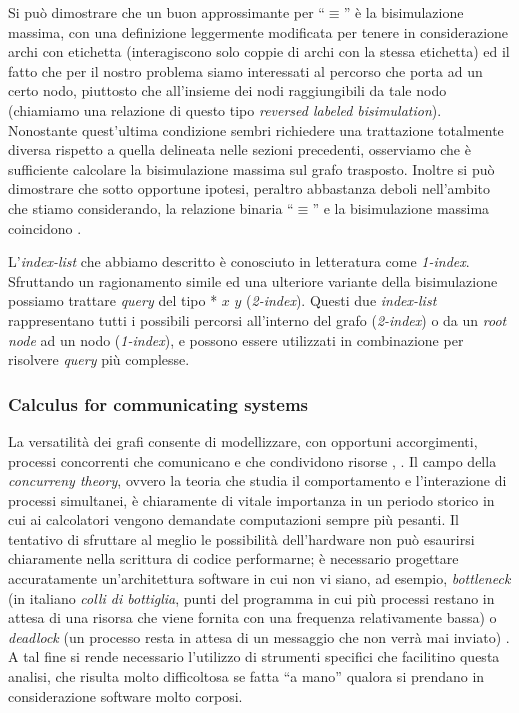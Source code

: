 Si può dimostrare che un buon approssimante per ``$\equiv$'' è la bisimulazione massima, con una definizione leggermente modificata per tenere in considerazione archi con etichetta (interagiscono solo coppie di archi con la stessa etichetta) ed il fatto che per il nostro problema siamo interessati al percorso che porta ad un certo nodo, piuttosto che all'insieme dei nodi raggiungibili da tale nodo (chiamiamo una relazione di questo tipo \emph{reversed labeled bisimulation}). Nonostante quest'ultima condizione sembri richiedere una trattazione totalmente diversa rispetto a quella delineata nelle sezioni precedenti, osserviamo che è sufficiente calcolare la bisimulazione massima sul grafo trasposto. Inoltre si può dimostrare che sotto opportune ipotesi, peraltro abbastanza deboli nell'ambito che stiamo considerando, la relazione binaria ``$\equiv$'' e la bisimulazione massima coincidono \cite{milo}.

L'\emph{index-list} che abbiamo descritto è conosciuto in letteratura come \emph{1-index}. Sfruttando un ragionamento simile ed una ulteriore variante della bisimulazione possiamo trattare \emph{query} del tipo * $x$  $y$ (\emph{2-index}). Questi due \emph{index-list} rappresentano tutti i possibili percorsi all'interno del grafo (\emph{2-index}) o da un \emph{root node} ad un nodo (\emph{1-index}), e possono essere utilizzati in combinazione per risolvere \emph{query} più complesse.

\subsubsection{Calculus for communicating systems}
La versatilità dei grafi consente di modellizzare, con opportuni accorgimenti, processi concorrenti che comunicano e che condividono risorse \cite{milner}, \cite{intro_calculus}. Il campo della \emph{concurreny theory}, ovvero la teoria che studia il comportamento e l'interazione di processi simultanei, è chiaramente di vitale importanza in un periodo storico in cui ai calcolatori vengono demandate computazioni sempre più pesanti. Il tentativo di sfruttare al meglio le possibilità dell'hardware non può esaurirsi chiaramente nella scrittura di codice performarne; è necessario progettare accuratamente un'architettura software in cui non vi siano, ad esempio, \emph{bottleneck} (in italiano \emph{colli di bottiglia}, punti del programma in cui più processi restano in attesa di una risorsa che viene fornita con una frequenza relativamente bassa) o \emph{deadlock} (un processo resta in attesa di un messaggio che non verrà mai inviato) \cite{concurrency}. A tal fine si rende necessario l'utilizzo di strumenti specifici che facilitino questa analisi, che risulta molto difficoltosa se fatta ``a mano'' qualora si prendano in considerazione software molto corposi.

